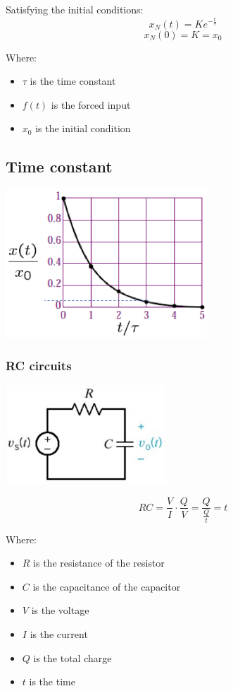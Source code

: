 \documentclass[11pt]{article}
\begin{document}
Satisfying the initial conditions:
\[x_N (t) = Ke^{- \frac{t}{\tau}}\]
\[x_N (0) = K = x_0\]

Where:
\begin{itemize}
\item \(\tau\) is the time constant
\item \(f(t)\) is the forced input
\item \(x_0\) is the initial condition
\end{itemize}
\subsection{Time constant}
\label{sec:org07a9e9d}
\begin{center}
\includegraphics[height=15em]{./images/time-constant-graph.png}
\end{center}
\subsubsection{RC circuits}
\label{sec:orgc73c179}
\begin{center}
\includegraphics[height=10em]{./images/rc-circuit-diagram.png}
\end{center}
\[RC = \frac{V}{I} \cdot \frac{Q}{V} = \frac{Q}{\frac{Q}{t}} = t\]

Where:
\begin{itemize}
\item \(R\) is the resistance of the resistor
\item \(C\) is the capacitance of the capacitor
\item \(V\) is the voltage
\item \(I\) is the current
\item \(Q\) is the total charge
\item \(t\) is the time
\end{itemize}
\end{document}
